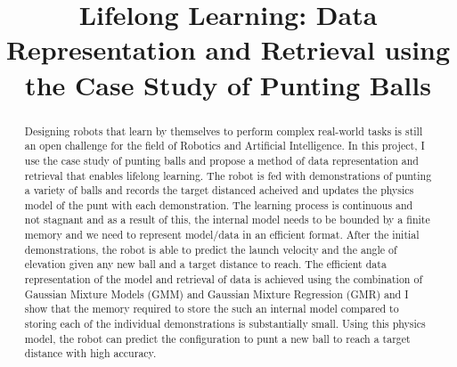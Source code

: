 \documentclass[conference]{IEEEtran}
\begin{document}
%
\title{Lifelong Learning: Data Representation and Retrieval using the Case Study of Punting Balls}


\author{
}


% 

\maketitle

\begin{abstract}
Designing robots that learn by themselves to perform complex real-world tasks is still an open challenge for the field of Robotics and Artificial Intelligence. In this project, I use the case study of punting balls and propose a method of data representation and retrieval that enables lifelong learning. The robot is fed with demonstrations of punting a variety of balls and records the target distanced acheived and updates the physics model of the punt with each demonstration. The learning process is continuous and not stagnant and as a result of this, the internal model needs to be bounded by a finite memory and we need to represent model/data in an efficient format. After the initial demonstrations, the robot is able to predict the launch velocity and the angle of elevation given any new ball and a target distance to reach. The efficient data representation of the model and retrieval of data is achieved using the combination of Gaussian Mixture Models (GMM) and Gaussian Mixture Regression (GMR) and I show that the memory required to store the such an internal model compared to storing each of the individual demonstrations is substantially small. Using this physics model, the robot can predict the configuration to punt a new ball to reach a target distance with high accuracy.
\end{abstract}
\end{document}
